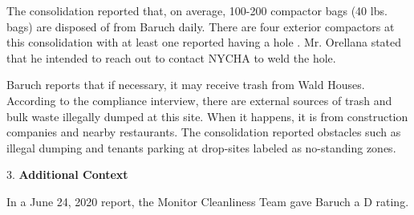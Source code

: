 The consolidation reported that, on average, 100-200 compactor bags (40 lbs. bags) are disposed of from Baruch daily. There are four exterior compactors at this consolidation with at least one reported having a hole . Mr. Orellana stated that he intended to reach out to contact NYCHA to weld the hole. 

Baruch reports that if necessary, it  may receive trash from Wald Houses. According to the compliance interview, there are external sources of trash and bulk waste illegally dumped at this site. When it happens, it is from construction companies and nearby restaurants. The consolidation reported obstacles such as illegal dumping and tenants parking at drop-sites labeled as no-standing zones.

3. \textbf{Additional Context} 

In a June 24, 2020 report, the Monitor Cleanliness Team gave Baruch a D rating. 